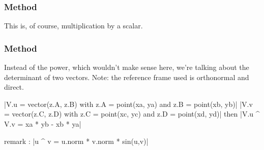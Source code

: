 \subsubsection{Method } %
\label{ssub:method_vector_mul}
This is, of course, multiplication by a scalar.

\begin{minipage}{.5\textwidth}


\end{minipage}
\begin{minipage}{.5\textwidth}
\begin{tkzexample}
\end{tkzexample}
\end{minipage}


\subsubsection{Method } %
\label{ssub:method_vector_det}
Instead of the power, which wouldn't make sense here, we're talking about the determinant of two vectors. Note: the reference frame used is orthonormal and direct. 

\begin{mybox}
|V.u = vector(z.A, z.B) with z.A = point(xa, ya) and z.B = point(xb, yb)|
|V.v = vector(z.C, z.D) with z.C = point(xc, yc) and z.D = point(xd, yd)|
then |V.u ^ V.v = xa * yb -  xb * ya|
\end{mybox}

remark : |u ^ v = u.norm * v.norm * sin(u,v)|



